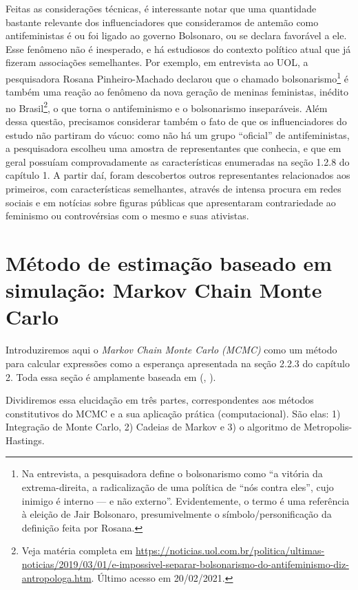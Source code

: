 \documentclass[
	12pt,				%
	openright,			%
	twoside,			%
	a4paper,			%
	english,			%
	brazil				%
	]{abntex2}
\begin{document}
\begin{anexosenv}
 Feitas as considerações técnicas, é interessante notar que uma quantidade bastante relevante dos influenciadores que consideramos de antemão como antifeministas é ou foi ligado ao governo Bolsonaro, ou se declara favorável a ele. Esse fenômeno não é inesperado, e há estudiosos do contexto político atual que já fizeram associações semelhantes. Por exemplo, em entrevista ao UOL, a pesquisadora Rosana Pinheiro-Machado declarou que o chamado bolsonarismo\footnote{Na entrevista, a pesquisadora define o bolsonarismo como ``a vitória da extrema-direita, a radicalização de uma política de ``nós contra eles'', cujo inimigo é interno --- e não externo''. Evidentemente, o termo é uma referência à eleição de Jair Bolsonaro, presumivelmente o símbolo/personificação da definição feita por Rosana.} é também uma reação ao fenômeno da nova geração de meninas feministas, inédito no Brasil\footnote{Veja matéria completa em \url{https://noticias.uol.com.br/politica/ultimas-noticias/2019/03/01/e-impossivel-separar-bolsonarismo-do-antifeminismo-diz-antropologa.htm}. Último acesso em 20/02/2021.}, o que torna o antifeminismo e o bolsonarismo inseparáveis. Além dessa questão, precisamos considerar também o fato de que os influenciadores do estudo não partiram do vácuo: como não há um grupo ``oficial'' de antifeministas, a pesquisadora escolheu uma amostra de representantes que conhecia, e que em geral possuíam comprovadamente as características enumeradas na seção 1.2.8 do capítulo 1. A partir daí, foram descobertos outros representantes relacionados aos primeiros, com características semelhantes, através de intensa procura em redes sociais e em notícias sobre figuras públicas que apresentaram contrariedade ao feminismo ou controvérsias com o mesmo e suas ativistas.
 
 \chapter{Método de estimação baseado em simulação: Markov Chain Monte Carlo}\label{mcmc}
 Introduziremos aqui o \emph{Markov Chain Monte Carlo (MCMC)} como um método para calcular expressões como a esperança apresentada na seção 2.2.3 do capítulo 2. Toda essa seção é amplamente baseada em (, \citeyear{gilks1996}).

 Dividiremos essa elucidação em três partes, correspondentes aos métodos constitutivos do MCMC e a sua aplicação prática (computacional). São elas: 1) Integração de Monte Carlo, 2) Cadeias de Markov e 3) o algoritmo de Metropolis-Hastings.
 

\end{anexosenv}
\end{document}
